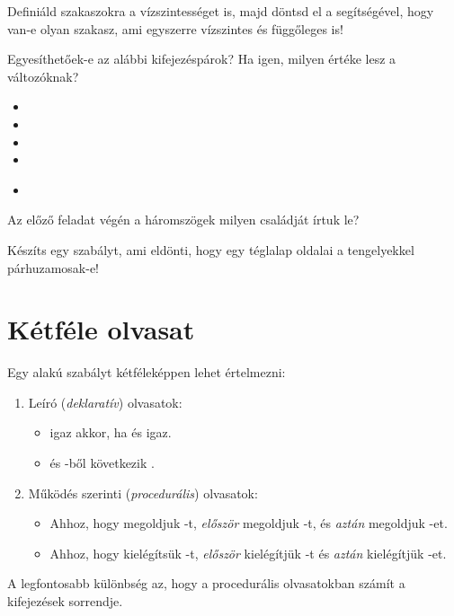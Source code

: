 \begin{problem}
Definiáld szakaszokra a vízszintességet is, majd
döntsd el a segítségével, hogy van-e olyan szakasz,
ami egyszerre vízszintes és függőleges is!
\end{problem}
\begin{problem}
Egyesíthetőek-e az alábbi kifejezéspárok? Ha igen,
milyen értéke lesz a változóknak?
\begin{itemize}
\item {}
\item {}
\item {}
\item {}
\item {}\\
\end{itemize}
\end{problem}
\begin{problem}
Az előző feladat végén a háromszögek milyen
családját írtuk le?
\end{problem}
\begin{problem}
Készíts egy szabályt, ami eldönti, hogy egy téglalap
oldalai a tengelyekkel párhuzamosak-e!
\end{problem}

\section{Kétféle olvasat}
Egy  alakú szabályt kétféleképpen
lehet értelmezni:
\begin{enumerate}
\item Leíró (\emph{deklaratív}) olvasatok:
  \begin{itemize}
    \item {} igaz akkor, ha  és  igaz.
    \item {} és -ből következik .
  \end{itemize}
\item Működés szerinti (\emph{procedurális}) olvasatok:
  \begin{itemize}
    \item Ahhoz, hogy megoldjuk -t,
      \emph{először} megoldjuk -t, és
      \emph{aztán} megoldjuk -et.
    \item Ahhoz, hogy kielégítsük -t,
      \emph{először} kielégítjük -t és
      \emph{aztán} kielégítjük -et.
  \end{itemize}
\end{enumerate}
A legfontosabb különbség az, hogy a procedurális
olvasatokban számít a kifejezések sorrendje.

